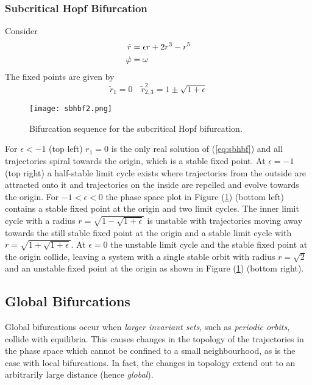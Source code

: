 \subsubsection{Subcritical Hopf Bifurcation}
Consider
\begin{equation}{\label{eq:sbhbf}}
	\begin{aligned}
		\dot{r}&=\epsilon r+2r^3-r^5\\
		\dot{\varphi}&=\omega
	\end{aligned}
\end{equation}
The fixed points are given by
\begin{equation}
	\tilde{r}_1=0\quad\tilde{r}_{2,3}^2=1\pm\sqrt{1+\epsilon}
\end{equation}
\begin{figure}[h!]
	\centering
	\texttt{[image: sbhbf2.png]}
	\caption{Bifurcation sequence for the subcritical Hopf bifurcation.}
	\label{fig:sbhbf}
\end{figure}
For $\epsilon<-1$ (top left) $r_1=0$ is the only real solution of (\ref{eq:sbhbf}) and all trajectories spiral towards the origin, which is a stable fixed point.
At $\epsilon=-1$ (top right) a half-stable limit cycle exists where trajectories from the outside are attracted onto it and trajectories on the inside are repelled and evolve towards the origin.
For $-1<\epsilon<0$ the phase space plot in Figure (\ref{fig:sbhbf}) (bottom left) contains a stable fixed point at the origin and two limit cycles.
The inner limit cycle with a radius $r=\sqrt{1-\sqrt{1+\epsilon}}$ is unstable with trajectories moving away towards the still stable fixed point at the origin and a stable limit cycle with $r=\sqrt{1+\sqrt{1+\epsilon}}$.
At $\epsilon=0$ the unstable limit cycle and the stable fixed point at the origin collide, leaving a system with a single stable orbit with radius $r=\sqrt{2}$ and an unstable fixed point at the origin as shown in Figure (\ref{fig:sbhbf}) (bottom right).
\subsection{Global Bifurcations}
Global bifurcations occur when \emph{larger invariant sets}, such as \emph{periodic orbits}, collide with equilibria.
This causes changes in the topology of the trajectories in the phase space which cannot be confined to a small neighbourhood, as is the case with local bifurcations.
In fact, the changes in topology extend out to an arbitrarily large distance (hence \emph{global}).
